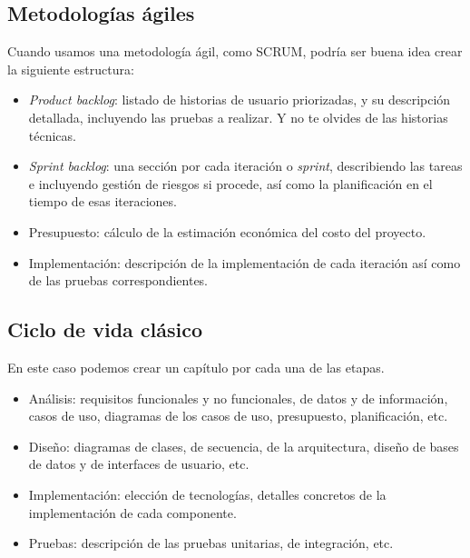 \subsection{Metodologías ágiles}

Cuando usamos una metodología ágil, como SCRUM, podría ser buena idea crear la siguiente estructura:
\begin{itemize}
    \item \textit{Product backlog}: listado de historias de usuario priorizadas, y su descripción detallada, incluyendo las pruebas a realizar. Y no te olvides de las historias técnicas. 
    \item \textit{Sprint backlog}: una sección por cada iteración o \textit{sprint}, describiendo las tareas e incluyendo gestión de riesgos si procede, así como la planificación en el tiempo de esas iteraciones.
    \item Presupuesto: cálculo de la estimación económica del costo del proyecto.
    \item Implementación: descripción de la implementación de cada iteración así como de las pruebas correspondientes. 
    
\end{itemize}
            
\subsection{Ciclo de vida clásico}
En este caso podemos crear un capítulo por cada una de las etapas.
                \begin{itemize}
                    \item Análisis: requisitos funcionales y no funcionales, de datos y de información, casos de uso, diagramas de los casos de uso, presupuesto, planificación, etc.
                    \item Diseño: diagramas de clases, de secuencia, de la arquitectura, diseño de bases de datos y de interfaces de usuario, etc.
                    \item Implementación: elección de tecnologías, detalles concretos de la implementación de cada componente.
                    \item Pruebas: descripción de las pruebas unitarias, de integración, etc.
                \end{itemize}

